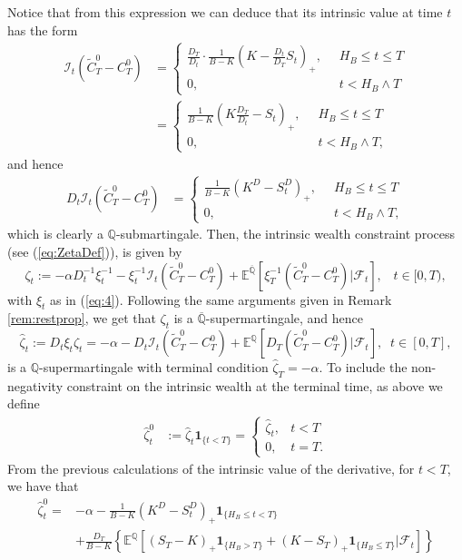 \documentclass[a4paper]{amsart}
\theoremstyle{definition}
\theoremstyle{remark}
\numberwithin{equation}{section}
\newcommand{\E}{\mathbb{E}}
\newcommand{\Q}{\mathbb{Q}}
\newcommand{\Fc}{\mathcal{F}}
\newcommand{\ind}{\boldsymbol{1}}
\newcommand{\Eq}[1]{\E^{\Q}\left[#1\right]}
\newcommand{\Ebq}[1]{\E^{\bQ}\left[#1\right]}
\newcommand{\ol}{\overline}
\newcommand{\In}{\mathcal{I}} %
\newcommand{\bQ}{\ol{\mathbb{Q}}}
\begin{document}
 Notice that from this expression we can deduce that its intrinsic value at time $t$ has the form
 \begin{align*}
 \In_t(\tilde{C}^0_T-C^0_T) &=
 \begin{cases}
 \frac{D_T}{D_t}\cdot\frac{1}{B-K}(K-\frac{D_t}{D_T}S_t)_+,\;\;&H_B\leq t \leq T\\
 0, \;\;&t<H_B\wedge T 
\end{cases}\\
&=
\begin{cases}
  \frac{1}{B-K}(K\frac{D_T}{D_t}-S_t)_+,\;\;&H_B\leq t\leq T\\
0, \;\;&t<H_B\wedge T ,
\end{cases}
\end{align*}
and hence
\begin{align*}
D_t \In_t(\tilde{C}^0_T-C^0_T) &=
\begin{cases}
  \frac{1}{B-K}(K^D-S^D_t)_+,\;\;&H_B\leq t\leq T\\
0, \;\;&t<H_B\wedge T,
\end{cases}
 \end{align*}
 which is clearly a $\Q$-submartingale.
 Then,  the intrinsic wealth constraint process (see (\ref{eq:ZetaDef})),   is given by
  \begin{equation} \label{eq:ZetaDef2}
  \zeta_t := -\alpha D_t^{-1}\xi_t^{-1} - \xi_t^{-1} \In_t(\tilde{C}^0_T-C^0_T) + \Ebq{ \xi_T^{-1} (\tilde{C}^0_T-C^0_T) | \Fc_t},\;\;\;t\in[0,T),
  \end{equation}
with $\xi_t$ as in (\ref{eq:4}). Following the same arguments given in Remark \ref{rem:restprop}, we get that $ \zeta_t$ is a $\bQ$-supermartingale, and hence
$$
\hat{\zeta}_t:=D_t\xi_t\zeta_t=-\alpha-D_t \In_t(\tilde{C}^0_T-C^0_T) + \Eq{ D_T (\tilde{C}^0_T-C^0_T) | \Fc_t},\;\;t\in[0,T],
$$
is a $\Q$-supermartingale  with terminal condition $\hat{\zeta}_T=-\alpha$. To include the non-negativity constraint on the intrinsic wealth at the terminal time, as above we define 
 \begin{align*}
    \hat{\zeta}_t^0 &:=\hat{\zeta}_t  \ind_{\{t<T\}}=
    \begin{cases}
      \hat{\zeta}_t ,& t < T\\
      0, & t = T.
    \end{cases}
\end{align*}
 From the previous calculations of the intrinsic value of the derivative, for $t<T$, we have that
   \begin{align*}
   \hat{\zeta}_t^0  =&-\alpha- \frac{1}{B-K}(K^D-S^D_t)_+\ind_{\{H_B\leq t< T\}}\\
  &+ \frac{D_T}{B-K}\left\{\Eq{(S_T-K)_+ \ind_{\{H_B> T\}}+(K-S_T)_+\ind_{\{H_B\leq T\}}| \Fc_t}\right\}
   \end{align*}
  
\end{document}
